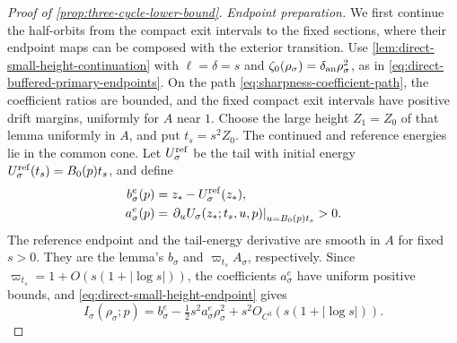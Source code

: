 \begin{proof}[Proof of \cref{prop:three-cycle-lower-bound}]
\emph{Endpoint preparation.}
We first continue the half-orbits from the compact exit intervals to
the fixed sections, where their endpoint maps can be composed with
the exterior transition. Use
\cref{lem:direct-small-height-continuation} with
\(\ell=\delta=s\) and \(\zeta_0(\rho_\sigma)=\delta_{\rm an}\rho_\sigma^2\),
as in \eqref{eq:direct-buffered-primary-endpoints}. On the path
\eqref{eq:sharpness-coefficient-path}, the coefficient ratios are
bounded, and the fixed compact exit intervals have positive drift
margins, uniformly for \(A\) near \(1\).
Choose the large height \(Z_1=Z_0\) of that lemma uniformly in \(A\),
and put \(t_s=s^2Z_0\). The continued and reference energies lie in
the common cone. Let \(U_\sigma^{\rm ref}\) be the tail with initial
energy \(U_\sigma^{\rm ref}(t_s)=B_0(p)t_s\), and define
\begin{equation}
\label{eq:sharpness-continuous-tail}
 \begin{aligned}
 b_\sigma^e(p)&=z_*-U_\sigma^{\rm ref}(z_*),\\
 a_\sigma^e(p)&=
 \left.\partial_uU_\sigma(z_*;t_s,u,p)\right|_{u=B_0(p)t_s}>0.
 \end{aligned}
\end{equation}
The reference endpoint and the tail-energy derivative are smooth in \(A\)
for fixed \(s>0\). They are the lemma's \(b_\sigma\) and
\(\varpi_{t_s}A_\sigma\), respectively.
Since \(\varpi_{t_s}=1+O(s(1+|\log s|))\), the coefficients
\(a_\sigma^e\) have uniform positive bounds, and
\eqref{eq:direct-small-height-endpoint} gives
\begin{equation}
\label{eq:sharpness-prepared-endpoints}
 I_\sigma(\rho_\sigma;p)
 =b_\sigma^e-\tfrac12s^2a_\sigma^e\rho_\sigma^2
                +s^2O_{C^3}(s(1+|\log s|)).
\end{equation}


\end{proof}
